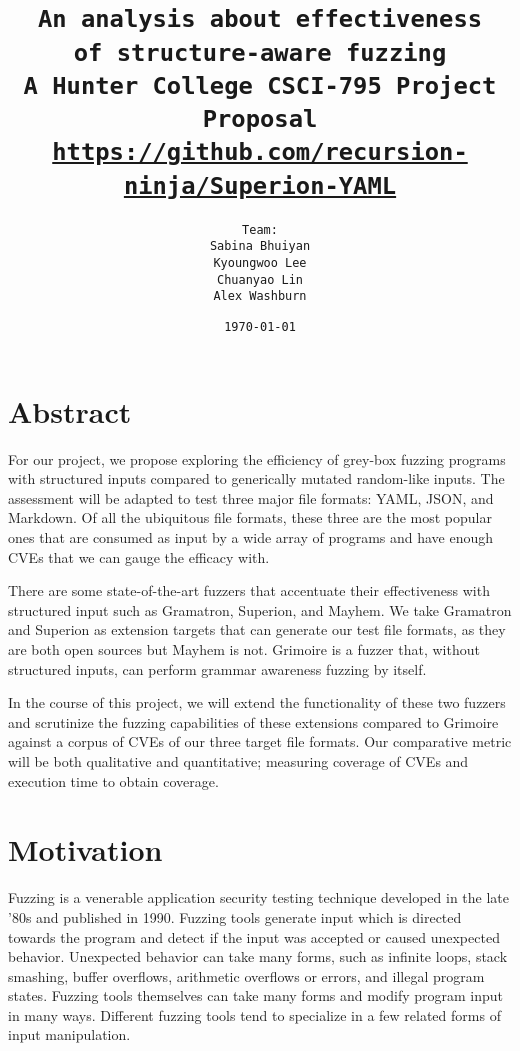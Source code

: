 \documentclass[12pt]{diazessay}
\title{\texttt{\huge{An analysis about effectiveness\\\vspace{-3mm}of structure-aware fuzzing} \\\vspace{-0.35cm} {\large A Hunter College CSCI-795 Project Proposal}\\\normalsize\url{https://github.com/recursion-ninja/Superion-YAML}}} %
\author{\texttt{{\Huge Team:}\\\vspace*{-0.5em} 
		Sabina Bhuiyan \\\vspace*{-0.5em} 
		Kyoungwoo Lee \\\vspace*{-0.5em}
		Chuanyao Lin \\\vspace*{-0.25em}
		Alex Washburn}} %
\date{\texttt{\today}} %
\begin{document}
\maketitle %

\vspace{2cm}
\section*{Abstract}


For our project, we propose exploring the efficiency of grey-box fuzzing programs with structured inputs compared to generically mutated random-like inputs.
The assessment will be adapted to test three major file formats: YAML, JSON, and Markdown.
Of all the ubiquitous file formats, these three are the most popular ones that are consumed as input by a wide array of programs and have enough CVEs that we can gauge the efficacy with.

There are some state-of-the-art fuzzers that accentuate their effectiveness with structured input such as Gramatron, Superion, and Mayhem.
We take Gramatron and Superion as extension targets that can generate our test file formats, as they are both open sources but Mayhem is not.
Grimoire is a fuzzer that, without structured inputs, can perform grammar awareness fuzzing by itself.

In the course of this project, we will extend the functionality of these two fuzzers and scrutinize the fuzzing capabilities of these extensions compared to Grimoire against a corpus of CVEs of our three target file formats.
Our comparative metric will be both qualitative and quantitative; measuring coverage of CVEs and execution time to obtain coverage.

\clearpage
\section*{Motivation}

Fuzzing is a venerable application security testing technique developed in the late '80s\cite{Barton1988} and published in 1990\cite{Miller1990}.
Fuzzing tools generate input which is directed towards the program and detect if the input was accepted or caused unexpected behavior.
Unexpected behavior can take many forms, such as infinite loops, stack smashing, buffer overflows, arithmetic overflows or errors, and illegal program states.
Fuzzing tools themselves can take many forms\cite{ModelBasedFuzzing}\cite{GrammarBasedFuzzing}\cite{ProtocolBasedFuzzing} and modify program input in many ways.
Different fuzzing tools tend to specialize in a few related forms of input\cite{InputDiversity} manipulation.
\end{document}
